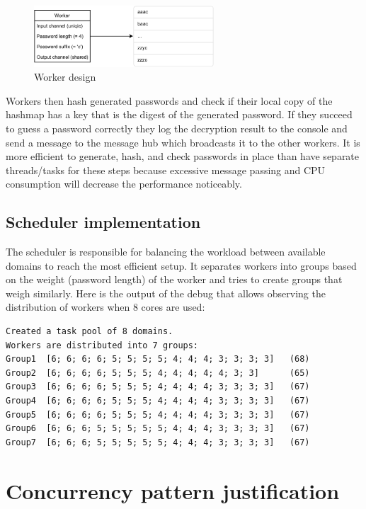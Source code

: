 \documentclass{article}
\begin{document}
\begin{figure}[h]
  \caption{Worker design}
  \vspace{0.2in}
  \centering
  \includegraphics[width=0.6\textwidth]{resources/worker.pdf}
\end{figure}

Workers then hash generated passwords and check if their local copy of the hashmap has a key that is the digest of the generated password. If they succeed to guess a password correctly they log the decryption result to the console and send a message to the message hub which broadcasts it to the other workers. It is more efficient to generate, hash, and check passwords in place than have separate threads/tasks for these steps because excessive message passing and CPU consumption will decrease the performance noticeably.

\subsection{Scheduler implementation}

The scheduler is responsible for balancing the workload between available domains to reach the most efficient setup. It separates workers into groups based on the weight (password length) of the worker and tries to create groups that weigh similarly. Here is the output of the debug that allows observing the distribution of workers when 8 cores are used:

\begin{verbatim}
Created a task pool of 8 domains.
Workers are distributed into 7 groups:
Group1  [6; 6; 6; 6; 5; 5; 5; 5; 4; 4; 4; 3; 3; 3; 3]   (68)
Group2  [6; 6; 6; 6; 5; 5; 5; 4; 4; 4; 4; 4; 3; 3]      (65)
Group3  [6; 6; 6; 6; 5; 5; 5; 4; 4; 4; 4; 3; 3; 3; 3]   (67)
Group4  [6; 6; 6; 6; 5; 5; 5; 4; 4; 4; 4; 3; 3; 3; 3]   (67)
Group5  [6; 6; 6; 6; 5; 5; 5; 4; 4; 4; 4; 3; 3; 3; 3]   (67)
Group6  [6; 6; 6; 5; 5; 5; 5; 5; 4; 4; 4; 3; 3; 3; 3]   (67)
Group7  [6; 6; 6; 5; 5; 5; 5; 5; 4; 4; 4; 3; 3; 3; 3]   (67)
\end{verbatim}

\section{Concurrency pattern justification}
\end{document}
